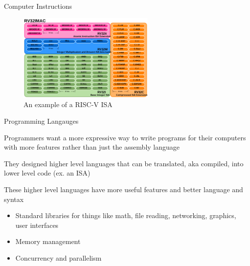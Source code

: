 \documentclass[aspectratio=169]{beamer}
\begin{document}
\begin{frame}{Computer Instructions}
    \begin{figure}
        \centering
        \includegraphics[width=0.6\textwidth]{imgs/RV32IMAC_Instruction_Set.svg.png}
        \\
        An example of a RISC-V ISA
    \end{figure}
\end{frame}

\begin{frame}{Programming Langauges}

    Programmers want a more expressive way to write programs for their computers with more features rather than just the assembly language

    \vspace{\baselineskip}

    They designed higher level languages that can be translated, aka compiled, into lower level code (ex. an ISA)

    \vspace{\baselineskip}

    These higher level languages have more useful features and better language and syntax

    \begin{itemize}
        \item Standard libraries for things like math, file reading, networking, graphics, user interfaces
        \item Memory management
        \item Concurrency and parallelism
    \end{itemize}
    
\end{frame}
\end{document}
